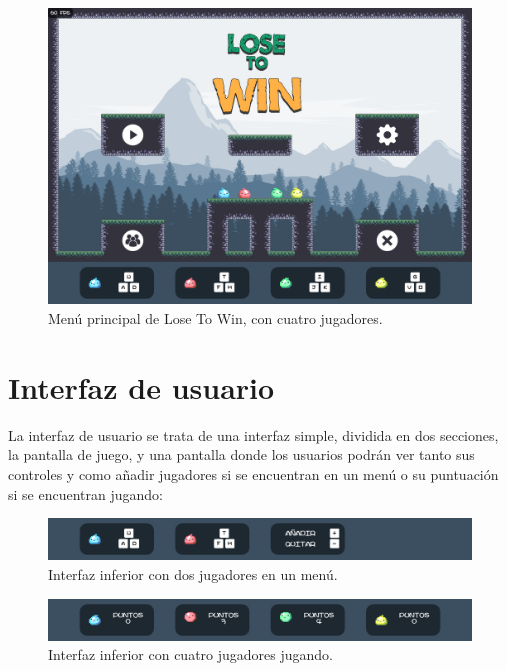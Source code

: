 \documentclass[12pt, spanish]{article}
\begin{document}
\begin{figure}[H]
  \centering
   \includegraphics[width=\textwidth]{"menu_principal.png"}
	\caption{Menú principal de Lose To Win, con cuatro jugadores.}\label{figure:titulo}
\end{figure}


\section{Interfaz de usuario}

La interfaz de usuario se trata de una interfaz simple, dividida en dos secciones, la pantalla de juego, y una pantalla donde los usuarios podrán ver tanto sus controles y como añadir jugadores si se encuentran en un menú o su puntuación si se encuentran jugando:

\begin{figure}[H]
  \centering
	\includegraphics[width=\textwidth]{"interfaz/interfaz_inferior_anadir.png"}
  \caption{Interfaz inferior con dos jugadores en un menú.}\label{figure:interfaz_inferior_anadir}
\end{figure}

\begin{figure}[H]
  \centering
	\includegraphics[width=\textwidth]{"interfaz/interfaz_inferior_jugando.png"}
  \caption{Interfaz inferior con cuatro jugadores jugando.}\label{figure:interfaz_inferior_jugando}
\end{figure}
\end{document}
